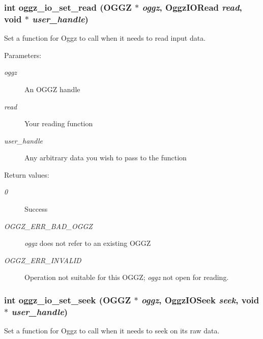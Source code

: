 \subsubsection{\setlength{\rightskip}{0pt plus 5cm}int oggz\_\-io\_\-set\_\-read ({\bf OGGZ} $\ast$ {\em oggz}, {\bf Oggz\-IORead} {\em read}, void $\ast$ {\em user\_\-handle})}\label{oggz__io_8h_a5}


Set a function for Oggz to call when it needs to read input data. 

\begin{Desc}
\item[Parameters:]
\begin{description}
\item[{\em oggz}]An OGGZ handle \item[{\em read}]Your reading function \item[{\em user\_\-handle}]Any arbitrary data you wish to pass to the function \end{description}
\end{Desc}
\begin{Desc}
\item[Return values:]
\begin{description}
\item[{\em 0}]Success \item[{\em OGGZ\_\-ERR\_\-BAD\_\-OGGZ}]{\em oggz\/} does not refer to an existing OGGZ \item[{\em OGGZ\_\-ERR\_\-INVALID}]Operation not suitable for this OGGZ; {\em oggz\/} not open for reading. \end{description}
\end{Desc}
\subsubsection{\setlength{\rightskip}{0pt plus 5cm}int oggz\_\-io\_\-set\_\-seek ({\bf OGGZ} $\ast$ {\em oggz}, {\bf Oggz\-IOSeek} {\em seek}, void $\ast$ {\em user\_\-handle})}\label{oggz__io_8h_a9}


Set a function for Oggz to call when it needs to seek on its raw data. 

